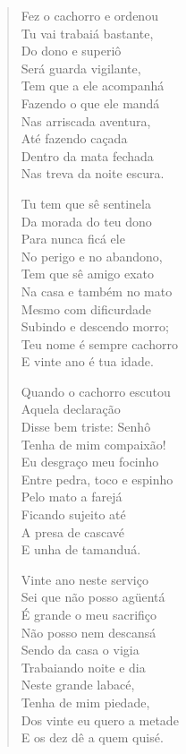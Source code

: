 \begin{verse}
Fez o cachorro e ordenou\\
Tu vai trabaiá bastante,\\
Do dono e superiô\\
Será guarda vigilante,\\
Tem que a ele acompanhá\\
Fazendo o que ele mandá\\
Nas arriscada aventura,\\
Até fazendo caçada\\
Dentro da mata fechada\\
Nas treva da noite escura.

Tu tem que sê sentinela\\
Da morada do teu dono\\
Para nunca ficá ele\\
No perigo e no abandono,\\
Tem que sê amigo exato\\
Na casa e também no mato\\
Mesmo com dificurdade\\
Subindo e descendo morro;\\
Teu nome é sempre cachorro\\
E vinte ano é tua idade.

Quando o cachorro escutou\\
Aquela declaração\\
Disse bem triste: Senhô\\
Tenha de mim compaixão!\\
Eu desgraço meu focinho\\
Entre pedra, toco e espinho\\
Pelo mato a farejá\\
Ficando sujeito até\\
A presa de cascavé\\
E unha de tamanduá.

Vinte ano neste serviço\\
Sei que não posso agüentá\\
É grande o meu sacrifiço\\
Não posso nem descansá\\
Sendo da casa o vigia\\
Trabaiando noite e dia\\
Neste grande labacé,\\
Tenha de mim piedade,\\
Dos vinte eu quero a metade\\
E os dez dê a quem quisé.


\end{verse}
